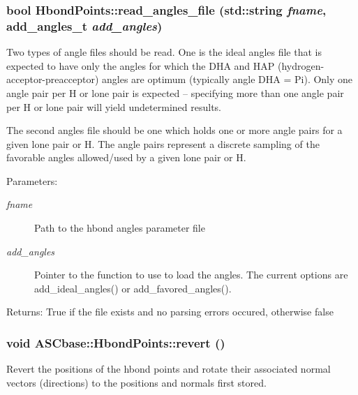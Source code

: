 \subsubsection{\setlength{\rightskip}{0pt plus 5cm}bool Hbond\-Points::read\_\-angles\_\-file (std::string {\em fname}, add\_\-angles\_\-t {\em add\_\-angles})\hspace{0.3cm}{\tt  [private]}}\label{classASCbase_1_1HbondPoints_dd0d8a2958197f4affccd88818d0f90c}


Two types of angle files should be read. One is the ideal angles file that is expected to have only the angles for which the DHA and HAP (hydrogen-acceptor-preacceptor) angles are optimum (typically angle DHA = Pi). Only one angle pair per H or lone pair is expected -- specifying more than one angle pair per H or lone pair will yield undetermined results.

The second angles file should be one which holds one or more angle pairs for a given lone pair or H. The angle pairs represent a discrete sampling of the favorable angles allowed/used by a given lone pair or H. \begin{Desc}
\item[Parameters:]
\begin{description}
\item[{\em fname}]Path to the hbond angles parameter file \item[{\em add\_\-angles}]Pointer to the function to use to load the angles. The current options are add\_\-ideal\_\-angles() or add\_\-favored\_\-angles(). \end{description}
\end{Desc}
\begin{Desc}
\item[Returns:]True if the file exists and no parsing errors occured, otherwise false \end{Desc}
\subsubsection{\setlength{\rightskip}{0pt plus 5cm}void ASCbase::Hbond\-Points::revert ()\hspace{0.3cm}{\tt  [inline]}}\label{classASCbase_1_1HbondPoints_cf6e668fee3d6d59bb7a1205db1c8a84}


Revert the positions of the hbond points and rotate their associated normal vectors (directions) to the positions and normals first stored. 
